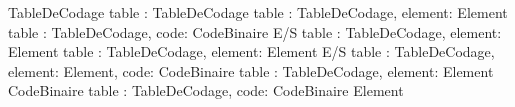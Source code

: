 	{}{TableDeCodage}
	{table : TableDeCodage}{\boolean}
	{table : TableDeCodage, element: Element}{\booleen}
	{table : TableDeCodage, code: CodeBinaire }{\booleen}
	{E/S table : TableDeCodage, element: Element}
	{table : TableDeCodage, element: Element}{\booleen}
	{E/S table : TableDeCodage, element: Element, code: CodeBinaire}
	{table : TableDeCodage, element: Element }{CodeBinaire}
	{table : TableDeCodage, code: CodeBinaire }{Element}

